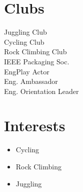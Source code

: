 \documentclass[]{chandan-cv}
\begin{document}
\begin{minipage}[t]{0.20\textwidth}

\section{Clubs}
Juggling Club \\
Cycling Club \\
Rock Climbing Club \\
IEEE Packaging Soc. \\
EngPlay Actor \\
Eng. Ambassador \\
Eng. Orientation Leader

\section{Interests}
\begin{itemize}
	\setlength\itemsep{-0.3em}
    \item Cycling
	\item Rock Climbing
	\item Juggling
\end{itemize}
\end{minipage}

%
%
\end{document}
